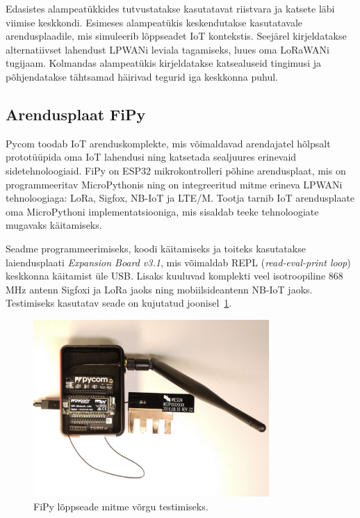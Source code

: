\documentclass[12pt]{article}
\begin{document}
    Edasistes alampeatükkides tutvustatakse kasutatavat riistvara ja katsete läbi viimise keskkondi.
    Esimeses alampeatükis keskendutakse kasutatavale arendusplaadile, mis simuleerib lõppseadet IoT kontekstis.
    Seejärel kirjeldatakse alternatiivset lahendust LPWANi leviala tagamiseks, luues oma LoRaWANi tugijaam.
    Kolmandas alampeatükis kirjeldatakse katsealuseid tingimusi ja põhjendatakse tähtsamad häirivad tegurid iga keskkonna puhul.

    \subsection{Arendusplaat FiPy}

    Pycom toodab IoT arenduskomplekte, mis võimaldavad arendajatel hõlpsalt prototüüpida oma IoT lahendusi ning katsetada sealjuures erinevaid sidetehnoloogiaid.
    FiPy on ESP32 mikrokontrolleri põhine arendusplaat, mis on programmeeritav MicroPythonis ning on integreeritud mitme erineva LPWANi tehnoloogiaga: LoRa, Sigfox, NB-IoT ja LTE\-/M.
    Tootja tarnib IoT arendusplaate oma MicroPythoni implementatsiooniga, mis sisaldab teeke tehnoloogiate mugavaks käitamiseks.

    Seadme programmeerimiseks, koodi käitamiseks ja toiteks kasutatakse laiendusplaati \textit{Expansion Board v3.1}, mis võimaldab REPL (\textit{read-eval-print loop}) keskkonna käitamist üle USB.
    Lisaks kuuluvad komplekti veel isotroopiline 868 MHz antenn Sigfoxi ja LoRa jaoks ning mobiilsideantenn NB-IoT jaoks.
    Testimiseks kasutatav seade on kujutatud joonisel~\ref{fig:fipy}.

    \begin{figure} [ht] %
        \begin{center}
            \includegraphics[width=0.8\textwidth]{figures/fipy.jpg}
            \caption{FiPy lõppseade mitme võrgu testimiseks.}
            \label{fig:fipy}
        \end{center}
    \end{figure}
\end{document}
